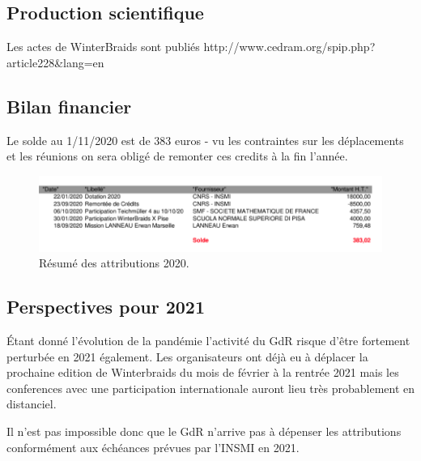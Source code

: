 \documentclass[]{article}
\begin{document}
\subsection{Production scientifique}\label{production-scientifique}

Les actes de WinterBraids sont publiés
http://www.cedram.org/spip.php?article228\&lang=en

\subsection{Bilan financier}\label{bilan-financiuxe8re}

Le solde au 1/11/2020 est de 383 euros - vu les contraintes sur les
déplacements et les réunions on sera obligé de remonter ces credits à la fin l'année.

\begin{figure}
\centering
\includegraphics{./budget_tresses.png}
\caption{Résumé des attributions 2020.}
\end{figure}

\subsection{Perspectives pour 2021}\label{perspectifs-pour-2021}

Étant donné l'évolution de la pandémie l'activité du GdR risque d'être
fortement perturbée en 2021 également. Les organisateurs ont déjà eu à déplacer la  prochaine edition de Winterbraids du mois de février à la rentrée 2021 mais les conferences avec une
participation internationale auront lieu très probablement en
distanciel.

Il n'est pas impossible donc que le GdR n'arrive pas à dépenser les attributions
conformément aux échéances prévues par l'INSMI en 2021.
\end{document}
